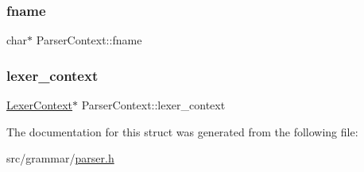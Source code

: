 \hypertarget{structParserContext_acecd9242efc7d4ac9541209881877a62}{}\label{structParserContext_acecd9242efc7d4ac9541209881877a62} 
\subsubsection{\texorpdfstring{fname}{fname}}
{\footnotesize\ttfamily char$\ast$ Parser\+Context\+::fname}

\hypertarget{structParserContext_adf2eb8d7e9618a07480cf5859b7dbad5}{}\label{structParserContext_adf2eb8d7e9618a07480cf5859b7dbad5} 
\subsubsection{\texorpdfstring{lexer\+\_\+context}{lexer\_context}}
{\footnotesize\ttfamily \hyperlink{structLexerContext}{Lexer\+Context}$\ast$ Parser\+Context\+::lexer\+\_\+context}



The documentation for this struct was generated from the following file\+:\begin{DoxyCompactItemize}
\item 
src/grammar/\hyperlink{parser_8h}{parser.\+h}\end{DoxyCompactItemize}
